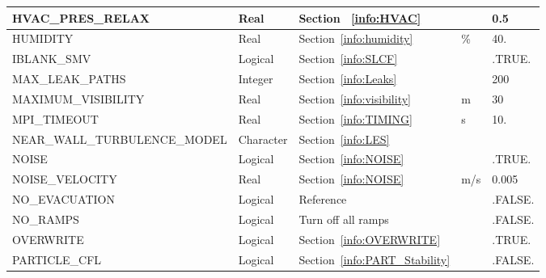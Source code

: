 \documentclass[11pt]{book}
\begin{document}
\begin{longtable}{@{\extracolsep{\fill}}|l|l|l|l|l|}
{\ct HVAC\_PRES\_RELAX}                         & Real          & Section ~\ref{info:HVAC}                              &               & 0.5               \\ \hline
{\ct HUMIDITY}                                  & Real          & Section~\ref{info:humidity}                           & \%            & 40.               \\ \hline
{\ct IBLANK\_SMV}                               & Logical       & Section~\ref{info:SLCF}                               &               & {\ct .TRUE.}      \\ \hline
{\ct MAX\_LEAK\_PATHS}                          & Integer       & Section~\ref{info:Leaks}                              &               &  200              \\ \hline
{\ct MAXIMUM\_VISIBILITY}                       & Real          & Section~\ref{info:visibility}                         &  m            &  30               \\ \hline
{\ct MPI\_TIMEOUT}                              & Real          & Section~\ref{info:TIMING}                             &  s            & 10.               \\ \hline
{\ct NEAR\_WALL\_TURBULENCE\_MODEL}             & Character     & Section~\ref{info:LES}                                &               &                   \\ \hline
{\ct NOISE}                                     & Logical       & Section~\ref{info:NOISE}                              &               & {\ct .TRUE.}      \\ \hline
{\ct NOISE\_VELOCITY}                           & Real          & Section~\ref{info:NOISE}                              &  m/s          & 0.005             \\ \hline
{\ct NO\_EVACUATION}                            & Logical       & Reference~\cite{FDS_Evac_Users_Guide}                 &               & {\ct .FALSE.}     \\ \hline
{\ct NO\_RAMPS}                                 & Logical       & Turn off all ramps                                    &               & {\ct .FALSE.}     \\ \hline
{\ct OVERWRITE}                                 & Logical       & Section~\ref{info:OVERWRITE}                          &               & {\ct .TRUE.}      \\ \hline
{\ct PARTICLE\_CFL}                             & Logical       & Section~\ref{info:PART_Stability}                     &               & {\ct .FALSE.}     \\ \hline

\end{longtable}
\end{document}
